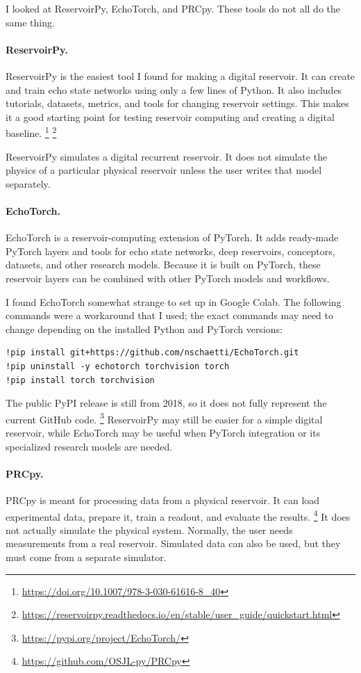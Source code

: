 \documentclass{article}
\begin{document}
I looked at ReservoirPy, EchoTorch, and PRCpy. These tools do not all do the same thing.

\paragraph{ReservoirPy.}
ReservoirPy is the easiest tool I found for making a digital reservoir. It can create and train echo state networks using only a few lines of Python. It also includes tutorials, datasets, metrics, and tools for changing reservoir settings. This makes it a good starting point for testing reservoir computing and creating a digital baseline.
\footnote{\url{https://doi.org/10.1007/978-3-030-61616-8_40}}
\footnote{\url{https://reservoirpy.readthedocs.io/en/stable/user_guide/quickstart.html}}

ReservoirPy simulates a digital recurrent reservoir. It does not simulate the physics of a particular physical reservoir unless the user writes that model separately.

\paragraph{EchoTorch.}
EchoTorch is a reservoir-computing extension of PyTorch. It adds ready-made PyTorch layers and tools for echo state networks, deep reservoirs, conceptors, datasets, and other research models. Because it is built on PyTorch, these reservoir layers can be combined with other PyTorch models and workflows.

I found EchoTorch somewhat strange to set up in Google Colab. The following commands were a workaround that I used; the exact commands may need to change depending on the installed Python and PyTorch versions:
\begin{verbatim}
!pip install git+https://github.com/nschaetti/EchoTorch.git
!pip uninstall -y echotorch torchvision torch
!pip install torch torchvision
\end{verbatim}
The public PyPI release is still from 2018, so it does not fully represent the current GitHub code.
\footnote{\url{https://pypi.org/project/EchoTorch/}}
ReservoirPy may still be easier for a simple digital reservoir, while EchoTorch may be useful when PyTorch integration or its specialized research models are needed.

\paragraph{PRCpy.}
PRCpy is meant for processing data from a physical reservoir. It can load experimental data, prepare it, train a readout, and evaluate the results.
\footnote{\url{https://github.com/OSJL-py/PRCpy}}
It does not actually simulate the physical system. Normally, the user needs measurements from a real reservoir. Simulated data can also be used, but they must come from a separate simulator.
\end{document}
